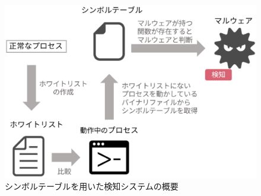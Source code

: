  \begin{figure}[h]
 \centering
    \includegraphics[width=120mm]{figures/system.eps}
    \caption{シンボルテーブルを用いた検知システムの概要}
    \label{fig:symbol}
 \end{figure}
 
\newpage



